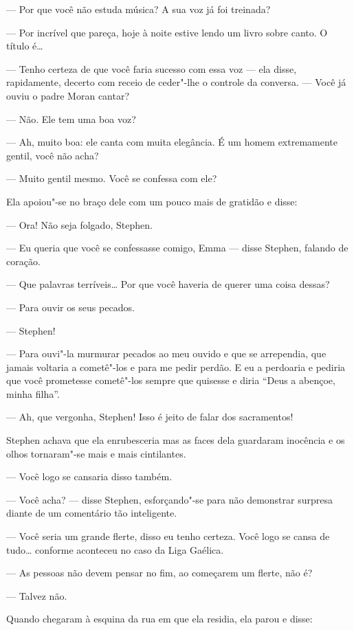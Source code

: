 --- Por que você não estuda música?  A sua voz já foi treinada?

--- Por incrível que pareça, hoje à noite estive lendo um livro sobre canto.  O
título é\ldots{}

--- Tenho certeza de que você faria sucesso com essa voz --- ela disse,
rapidamente, decerto com receio de ceder"-lhe o controle da conversa.  --- Você
já ouviu o padre Moran cantar?

--- Não.  Ele tem uma boa voz?

--- Ah, muito boa: ele canta com muita elegância.  É um homem extremamente
gentil, você não acha?

--- Muito gentil mesmo.  Você se confessa com ele?

Ela apoiou"-se no braço dele com um pouco mais de gratidão e disse:

--- Ora!  Não seja folgado, Stephen.

--- Eu queria que você se confessasse comigo, Emma --- disse Stephen, falando
de coração.

--- Que palavras terríveis\ldots{}  Por que você haveria de querer uma coisa dessas?

--- Para ouvir os seus pecados.

--- Stephen!

--- Para ouvi"-la murmurar pecados ao meu ouvido e que se arrependia, que jamais
voltaria a cometê"-los e para me pedir perdão.  E eu a perdoaria e pediria que
você prometesse cometê"-los sempre que quisesse e diria “Deus a abençoe, minha
filha”.

--- Ah, que vergonha, Stephen!  Isso é jeito de falar dos sacramentos!

Stephen achava que ela enrubesceria mas as faces dela guardaram inocência e os
olhos tornaram"-se mais e mais cintilantes.

--- Você logo se cansaria disso também.

--- Você acha? --- disse Stephen, esforçando"-se para não demonstrar surpresa
diante de um comentário tão inteligente.

--- Você seria um grande flerte, disso eu tenho certeza.  Você logo se cansa de
tudo\ldots{} conforme aconteceu no caso da Liga Gaélica.

--- As pessoas não devem pensar no fim, ao começarem um flerte, não é?

--- Talvez não.

Quando chegaram à esquina da rua em que ela residia, ela parou e disse:

